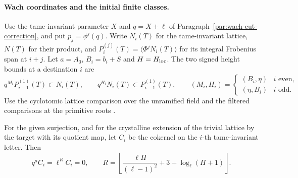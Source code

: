 \paragraph{Wach coordinates and the initial finite classes.}
\label{par:thick-initial-classes}
Use the tame-invariant parameter \(X\) and \(q=X+\ell\) of
Paragraph~\ref{par:wach-cut-correction}, and put \(p_j=\phi^j(q)\).
Write \(N_i(T)\) for the tame-invariant lattice, \(N(T)\) for their
product, and \(P_i^{(j)}(T)=\langle\Phi^jN_i(T)\rangle\) for its
integral Frobenius span at \(i+j\). Let \(a=A_0\),
\(B_i=b_i+S\) and \(H=H_{\rm loc}\). The two signed height bounds
at a destination \(i\) are
\[
 q^{M_i}P_{i-1}^{(1)}(T)\subset N_i(T),\qquad
 q^{H_i}N_i(T)\subset P_{i-1}^{(1)}(T),\qquad
 (M_i,H_i)=
 \begin{cases}(B_i,\eta)&i\text{ even},\\
 (\eta,B_i)&i\text{ odd}.\end{cases}
\]
Use the cyclotomic lattice comparison over the unramified field
and the filtered comparisons at the primitive roots
\cite[Proposition III.2.1 and Corollary III.4.5]{berger-wach}.
\begin{lemma}
For the given surjection, and for the crystalline extension of
the trivial lattice by the target with its quotient map, let \(C_i\) be the cokernel on the \(i\)-th tame-invariant letter. Then
\[
 q^a C_i=\ell^R C_i=0,\qquad R=\left\lfloor\frac{\ell H}{(\ell-1)^2}+3+\log_\ell(H+1)\right\rfloor.
\]
\end{lemma}
